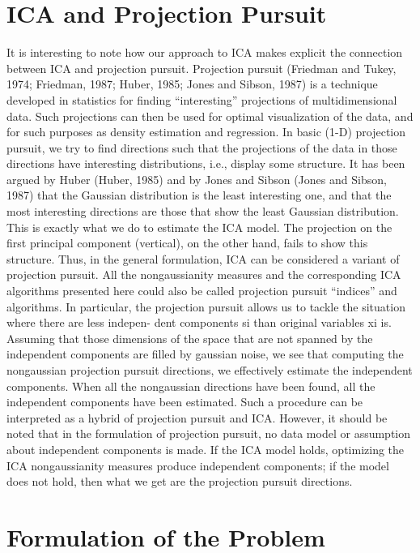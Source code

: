 \documentclass[12pt, a4paper, onecolumn]{IEEEtran}
\begin{document}
\section{ICA and Projection Pursuit}
It is interesting to note how our approach to ICA makes explicit the connection between ICA and projection pursuit. Projection pursuit (Friedman and Tukey, 1974; Friedman, 1987; Huber, 1985; Jones and Sibson, 1987) is a technique developed in statistics for finding “interesting” projections of multidimensional data. Such projections can then be used for optimal visualization of the data, and for such purposes as density estimation and regression. In basic (1-D) projection pursuit, we try to find directions such that the projections of the data in those directions have interesting distributions, i.e., display some structure. It has been argued by Huber (Huber, 1985) and by Jones and Sibson (Jones and Sibson, 1987) that the Gaussian distribution is the least interesting one, and that the most interesting directions are those that show the least Gaussian distribution. This is exactly what we do to estimate the ICA model. The projection on the first principal component (vertical), on the other hand, fails to show this structure.
Thus, in the general formulation, ICA can be considered a variant of projection pursuit. All the nongaussianity measures and the corresponding ICA algorithms presented here could also be called projection pursuit “indices” and algorithms. In particular, the projection pursuit allows us to tackle the situation where there are less indepen- dent components si than original variables xi is. Assuming that those dimensions of the space that are not spanned by the independent components are filled by gaussian noise, we see that computing the nongaussian projection pursuit directions, we effectively estimate the independent components. When all the nongaussian directions have been found, all the independent components have been estimated. Such a procedure can be interpreted as a hybrid of projection pursuit and ICA.
However, it should be noted that in the formulation of projection pursuit, no data model or assumption about independent components is made. If the ICA model holds, optimizing the ICA nongaussianity measures produce independent components; if the model does not hold, then what we get are the projection pursuit directions.

\section{Formulation of the Problem}
\end{document}
